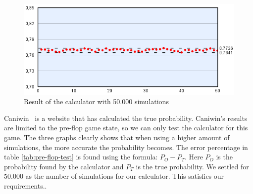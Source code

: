 \begin{figure}[H]
  \center
    \includegraphics[scale=0.775]{images/MonteCarlo/50k.png}
  \caption{Result of the calculator with 50.000 simulations \label{fig:mc50}}
\end{figure}


Caniwin~\cite{caniwin} is a website that has calculated the true probability.
Caniwin's results are limited to the pre-flop game state, so we can only test the calculator for this game.
The three graphs clearly shows that when using a higher amount of simulations, the more accurate the probability becomes.
The error percentage in table \ref{tab:pre-flop-test} is found using the formula: $P_{O} - P_{T}$. Here $P_{O}$ is the probability found by the calculator and $P_{T} $ is the true probability. 
We settled for 50.000 as the number of simulations for our calculator. This satisfies our requirements..


